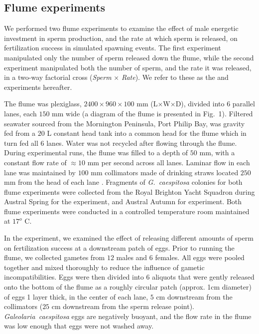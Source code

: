 \documentclass{article}
\begin{document}
	\subsection*{Flume experiments}
	We performed two flume experiments to examine the effect of male energetic investment in sperm production, and the rate at which sperm is released, on fertilization success in simulated spawning events. The first experiment manipulated only the number of sperm released down the flume, while the second experiment manipulated both the number of sperm, and the rate it was released, in a two-way factorial cross (\textit{Sperm} $\times$ \textit{Rate}). We refer to these as the  and  experiments hereafter. 

	The flume was plexiglass, $2400 \times 960 \times 100$ mm (L$\times$W$\times$D), divided into $6$ parallel lanes, each $150$ mm wide (a diagram of the flume is presented in Fig.~1). Filtered seawater sourced from the Mornington Peninsula, Port Philip Bay, was gravity fed from a $20$ L constant head tank into a common head for the flume which in turn fed all $6$ lanes. Water was not recycled after flowing through the flume. During experimental runs, the flume was filled to a depth of $50$ mm, with a constant flow rate of $\approx 10$ mm per second across all lanes. Laminar flow in each lane was maintained by $100$ mm collimators made of drinking straws located $250$ mm from the head of each lane \citep{YundMeidel2003}. Fragments of \textit{G.~caespitosa} colonies for both flume experiments were collected from the Royal Brighton Yacht Squadron during Austral Spring for the  experiment, and Austral Autumn for  experiment. Both flume experiments were conducted in a controlled temperature room maintained at $17^o$ C.

	In the  experiment, we examined the effect of releasing different amounts of sperm on fertilization success at a downstream patch of eggs. Prior to running the flume, we collected gametes from $12$ males and $6$ females. All eggs were pooled together and mixed thoroughly to reduce the influence of gametic incompatibilities. Eggs were then divided into $6$ aliquots that were gently released onto the bottom of the flume as a roughly circular patch (approx. 1cm diameter) of eggs 1 layer thick, in the center of each lane, $5$ cm downstream from the collimators ($25$ cm downstream from the sperm release point). \textit{Galeolaria~caespitosa} eggs are negatively buoyant, and the flow rate in the flume was low enough that eggs were not washed away. 
\end{document}
